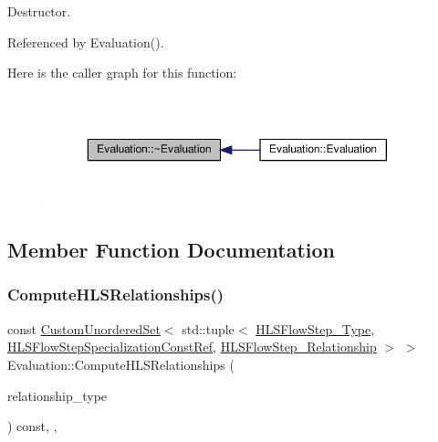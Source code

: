 Destructor. 



Referenced by Evaluation().

Here is the caller graph for this function\+:
\nopagebreak
\begin{figure}[H]
\begin{center}
\leavevmode
\includegraphics[width=350pt]{dd/d82/classEvaluation_adaca340ad09e89e3c6d363d07a9c181b_icgraph}
\end{center}
\end{figure}


\subsection{Member Function Documentation}
\mbox{\label{classEvaluation_a6a87bfae16ed93582db98d99b4c48403}} 
\subsubsection{\texorpdfstring{Compute\+H\+L\+S\+Relationships()}{ComputeHLSRelationships()}}
{\footnotesize\ttfamily const \hyperlink{classCustomUnorderedSet}{Custom\+Unordered\+Set}$<$ std\+::tuple$<$ \hyperlink{hls__step_8hpp_ada16bc22905016180e26fc7e39537f8d}{H\+L\+S\+Flow\+Step\+\_\+\+Type}, \hyperlink{hls__step_8hpp_a5fdd2edf290c196531d21d68e13f0e74}{H\+L\+S\+Flow\+Step\+Specialization\+Const\+Ref}, \hyperlink{hls__step_8hpp_a3ad360b9b11e6bf0683d5562a0ceb169}{H\+L\+S\+Flow\+Step\+\_\+\+Relationship} $>$ $>$ Evaluation\+::\+Compute\+H\+L\+S\+Relationships (\begin{DoxyParamCaption}\item[{const \hyperlink{classDesignFlowStep_a723a3baf19ff2ceb77bc13e099d0b1b7}{Design\+Flow\+Step\+::\+Relationship\+Type}}]{relationship\+\_\+type }\end{DoxyParamCaption}) const\hspace{0.3cm}{\ttfamily [override]}, {\ttfamily [private]}, {\ttfamily [virtual]}}



